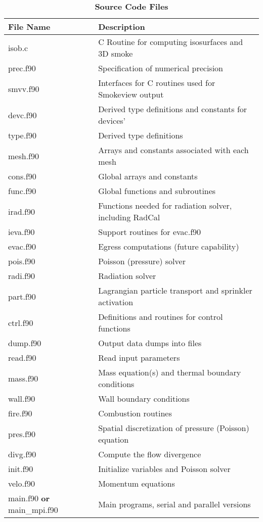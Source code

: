 \documentclass[11pt]{book}
\begin{document}
\begin{table}[ht]
\begin{center}
\caption{\bf Source Code Files}
\label{tab:sourcefiles}
\vspace{.1in}
\begin{tabular}{|l|l|}
\hline
File Name  & Description  \\ \hline \hline
isob.c     & C Routine for computing isosurfaces and 3D smoke \\ \hline \hline
prec.f90   & Specification of numerical precision \\ \hline
smvv.f90   & Interfaces for C routines used for Smokeview output \\ \hline
devc.f90   & Derived type definitions and constants for devices' \\ \hline
type.f90   & Derived type definitions \\ \hline
mesh.f90   & Arrays and constants associated with each mesh \\ \hline
cons.f90   & Global arrays and constants \\ \hline
func.f90   & Global functions and subroutines \\ \hline
irad.f90   & Functions needed for radiation solver, including RadCal \\ \hline
ieva.f90   & Support routines for evac.f90 \\ \hline
evac.f90   & Egress computations (future capability) \\ \hline
pois.f90   & Poisson (pressure) solver \\ \hline
radi.f90   & Radiation solver  \\ \hline
part.f90   & Lagrangian particle transport and sprinkler activation \\ \hline
ctrl.f90   & Definitions and routines for control functions \\ \hline
dump.f90   & Output data dumps into files \\ \hline
read.f90   & Read input parameters \\ \hline
mass.f90   & Mass equation(s) and thermal boundary conditions \\ \hline
wall.f90   & Wall boundary conditions \\ \hline
fire.f90   & Combustion routines \\ \hline
pres.f90   & Spatial discretization of pressure (Poisson) equation \\ \hline
divg.f90   & Compute the flow divergence \\ \hline
init.f90   & Initialize variables and Poisson solver \\ \hline
velo.f90   & Momentum equations \\ \hline
main.f90 {\bf or} main\_mpi.f90   & Main programs, serial and parallel versions \\ \hline
\end{tabular}
\end{center}
\end{table}
\end{document}
